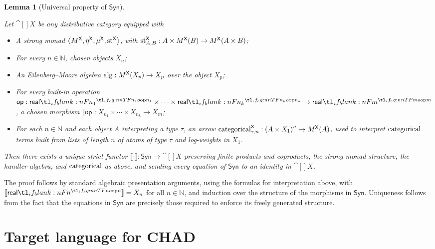 \documentclass[11pt,a4paper]{article}
\newtheorem{lemma}[theorem]{Lemma}
\theoremstyle{definition}
\theoremstyle{remark}
\providecommand{\N}{\mathbb{N}}
\providecommand{\Syn}{\mathsf{Syn}}
\providecommand{\srcop}{\mathsf{op}}
\providecommand{\genint}[1]{\llbracket #1\rrbracket}
\providecommand{\categ}{\operatorname{categorical}}
\providecommand{\str}{\operatorname{st}}
\begin{document}
\begin{lemma}[Universal property of \( \Syn \)]
  \label{lem:appendix-universal-property-of-the-syntactic-category-of-the-source-language}

  Let \( \cat[]{X} \) be any distributive category equipped with
  \begin{itemize}
  \item A strong monad \( \tuple{ M^{\cat[]{X}}, \eta^{\cat[]{X}}, \mu^{\cat[]{X}}, \str^{\cat[]{X}} } \), with \( \str^{\cat[]{X}}_{A,B}: A \times \Fun[nn]{M^{\cat[]{X}}}{B} \to \Fun[nn]{M^{\cat[]{X}}}{A \times B} \);
  \item For every \( n \in \N \), chosen objects \( X_{n} \);
  \item An Eilenberg--Moore algebra \( \opn{alg}: \Fun[nn]{ M^{\cat[]{X}} }{ X_{p} } \to X_{p} \) over the object \( X_{p} \);
  \item For every built-in operation \( \srcop: \srcreal[n_{1}] \times \cdots \times \srcreal[n_{k}] \to \srcreal[m] \), a chosen morphism \( \genint{\srcop}: X_{n_{1}} \times \cdots \times X_{n_{k}} \to X_{m} \);
  \item For each \( n \in \N \) and each object \( A \) interpreting a type \( \tau \), an arrow \( \categ^{\cat[]{X}}_{\tau, n}: \left( A \times X_{1} \right)^{n} \to \Fun[nn]{ M^{\cat[]{X}} }{ A } \), used to interpret \( \opn[b]{categorical} \) terms built from lists of length \( n \) of atoms of type \( \tau \) and log-weights in \( X_{1} \).
  \end{itemize}

  Then there exists a unique strict functor \( \genint{ \cdot }: \Syn \to \cat[]{X} \) preserving finite products and coproducts, the strong monad structure, the handler algebra, and \( \opn[b]{categorical} \) as above, and sending every equation of \( \Syn \) to an identity in \( \cat[]{X} \). 
\end{lemma}

The proof follows by standard algebraic presentation arguments, using the formulas for interpretation above, with \( \genint{\srcreal[n]} = X_{n} \) for all \( n \in \N \), and induction over the structure of the morphisms in \( \Syn \). Uniqueness follows from the fact that the equations in \( \Syn \) are precisely those required to enforce its freely generated structure.

\section{Target language for CHAD}
\label{sec:appendix-target-language-for-chad}
\end{document}
